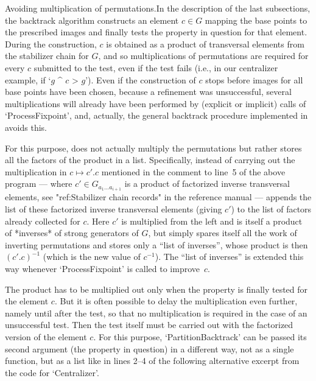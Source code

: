 {\bsf Avoiding multiplication  of permutations.}\quad In the  description
of  the last subsections, the  backtrack  algorithm constructs an element
$c\in G$ mapping  the base points   to the prescribed images  and finally
tests the property in question for that element. During the construction,
$c$ is obtained as a product  of transversal elements from the stabilizer
chain for $G$,  and so multiplications  of permutations are required  for
every $c$  submitted to the test,  even if the  test fails (i.e.,  in our
centralizer example, if `$g$ ^ $c$ \<> $g$'). Even if the construction of
$c$ stops before images  for all base  points have been chosen, because a
refinement was unsuccessful,  several  multiplications will  already have
been performed by (explicit or implicit) calls of `ProcessFixpoint', and,
actually, the general   backtrack procedure implemented in  {\GAP} avoids
this.

For this purpose, {\GAP} does  not actually multiply the permutations but
rather stores  all the factors of the   product in a  list. Specifically,
instead of carrying out  the multiplication in $c\mapsto c'.c$  mentioned
in  the   comment  to  line~5 of  the   above  program   --- where $c'\in
G_{a_1\ldots  a_{i+1}}$ is a  product  of factorized inverse  transversal
elements, see "ref:Stabilizer chain records" in the reference manual  ---
{\GAP} appends the list of these factorized inverse transversal  elements
(giving $c'$) to the list of factors already collected for $c$. Here $c'$
is multiplied from the left and is itself  a  product  of  *inverses*  of
strong generators of $G$, but {\GAP} simply spares itself all the work of
inverting permutations and stores only  a  ``list  of  inverses'',  whose
product is then $(c'.c)^{-1}$ (which is the new value of  $c^{-1}$).  The
``list of inverses'' is extended this way whenever  `ProcessFixpoint'  is
called to improve~$c$.

The  product has to be multiplied  out only when  the property is finally
tested  for  the  element $c$. But  it  is  often possible  to  delay the
multiplication  even  further, namely  until after   the test, so  that no
multiplication is required in the case of  an unsuccessful test. Then the
test  itself  must be carried   out with the  factorized   version of the
element $c$.  For  this purpose,  `PartitionBacktrack' can  be passed its
second argument (the property  in question) in  a different way, not as a
single {\GAP} function, but as a list like in lines 2--4 of the following
alternative excerpt from the code for `Centralizer'.

